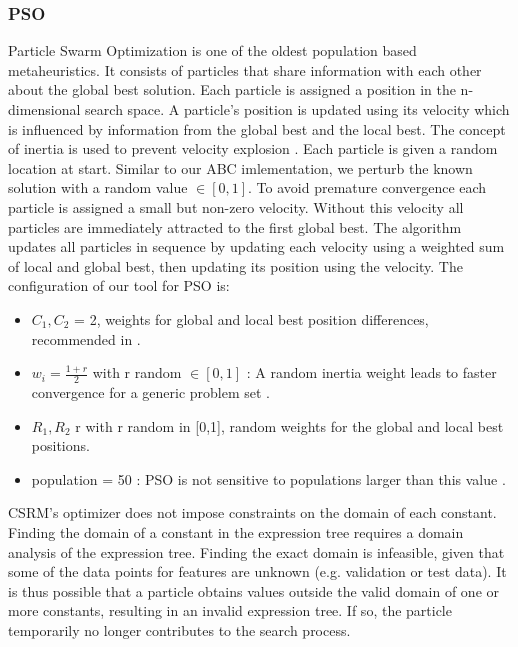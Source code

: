 \subsubsection{PSO}
Particle Swarm Optimization \cite{PSO} is one of the oldest population based metaheuristics. It consists of particles that share information with each other about the global best solution.
Each particle is assigned a position in the n-dimensional search space. A particle's position is updated using its velocity which is influenced by information from the global best and the local best. The concept of inertia is used to prevent velocity explosion \cite{PSOExplosion}.
Each particle is given a random location at start. Similar to our ABC imlementation, we perturb the known solution with a random value $\in [0,1]$.
To avoid premature convergence each particle is assigned a small but non-zero velocity. Without this velocity all particles are immediately attracted to the first global best. 
The algorithm updates all particles in sequence by updating each velocity using a weighted sum of local and global best, then updating its position using the velocity.
The configuration of our tool for PSO is:
\begin{itemize}
\item $C_1, C_2$ = 2, weights for global and local best position differences, recommended in \cite{PSOParameter}.
\item $w_i = \frac{1 + r}{2}$ with r random $\in [0,1]$ : A random inertia weight leads to faster convergence for a generic problem set \cite{PSOInertia}.
\item $R_1, R_2$ r with r random in [0,1], random weights for the global and local best positions. 
\item population = 50 : PSO is not sensitive to populations larger than this value \cite{SwarmIntelligence}.
\end{itemize}
CSRM's optimizer does not impose constraints on the domain of each constant. Finding the domain of a constant in the expression tree requires a domain analysis of the expression tree. Finding the exact domain is infeasible, given that some of the data points for features are unknown (e.g. validation or test data). It is thus possible that a particle obtains values outside the valid domain of one or more constants, resulting in an invalid expression tree. If so, the particle temporarily no longer contributes to the search process.
